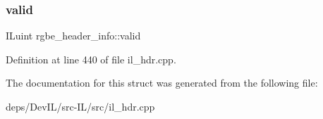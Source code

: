 \subsubsection{\texorpdfstring{valid}{valid}}
{\footnotesize\ttfamily I\+Luint rgbe\+\_\+header\+\_\+info\+::valid}



Definition at line 440 of file il\+\_\+hdr.\+cpp.



The documentation for this struct was generated from the following file\+:\begin{DoxyCompactItemize}
\item 
deps/\+Dev\+I\+L/src-\/\+I\+L/src/il\+\_\+hdr.\+cpp\end{DoxyCompactItemize}
